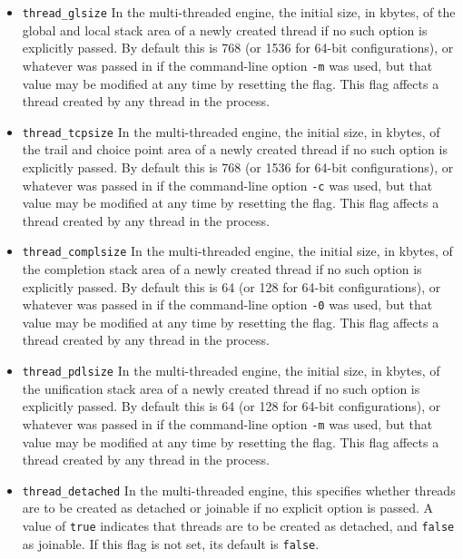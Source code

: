 \begin{description}
\begin{itemize}
\item {\tt thread\_glsize} In the multi-threaded engine, the initial
  size, in kbytes, of the global and local stack area of a newly
  created thread if no such option is explicitly passed.  By default
  this is 768 (or 1536 for 64-bit configurations), or whatever was
  passed in if the command-line option {\tt -m} was used, but that
  value may be modified at any time by resetting the flag.  This flag
  affects a thread created by any thread in the process.

\item {\tt thread\_tcpsize} In the multi-threaded engine, the initial
  size, in kbytes, of the trail and choice point area of a newly
  created thread if no such option is explicitly passed.  By default
  this is 768 (or 1536 for 64-bit configurations), or whatever was
  passed in if the command-line option {\tt -c} was used, but that
  value may be modified at any time by resetting the flag.  This flag
  affects a thread created by any thread in the process.

\item {\tt thread\_complsize} In the multi-threaded engine, the
  initial size, in kbytes, of the completion stack area of a newly
  created thread if no such option is explicitly passed.  By default
  this is 64 (or 128 for 64-bit configurations), or whatever was
  passed in if the command-line option {\tt -0} was used, but that
  value may be modified at any time by resetting the flag.  This flag
  affects a thread created by any thread in the process.

\item {\tt thread\_pdlsize} In the multi-threaded engine, the initial
  size, in kbytes, of the unification stack area of a newly created
  thread if no such option is explicitly passed.  By default this is
  64 (or 128 for 64-bit configurations), or whatever was passed in if
  the command-line option {\tt -m} was used, but that value may be
  modified at any time by resetting the flag.  This flag affects a
  thread created by any thread in the process.

\item {\tt thread\_detached} In the multi-threaded engine, this
  specifies whether threads are to be created as detached or joinable
  if no explicit option is passed.  A value of {\tt true} indicates
  that threads are to be created as detached, and {\tt false} as
  joinable.  If this flag is not set, its default is {\tt false}.


\end{itemize}
\end{description}
